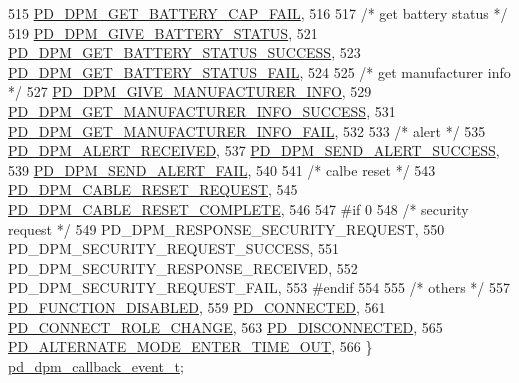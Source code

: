\begin{DoxyCode}
515     \hyperlink{group__usb__pd__stack_gga6e10571af6af1a42760ea442ab580eb8a728741dabfcf75b6187b16075e644879}{PD\_DPM\_GET\_BATTERY\_CAP\_FAIL},
516 
517     \textcolor{comment}{/* get battery status */}
519     \hyperlink{group__usb__pd__stack_gga6e10571af6af1a42760ea442ab580eb8a884eedc8a4ed6f0d1cdbf6c582a0dc36}{PD\_DPM\_GIVE\_BATTERY\_STATUS},
521     \hyperlink{group__usb__pd__stack_gga6e10571af6af1a42760ea442ab580eb8a9e1518da0f1b44c13a019abc96cedfbe}{PD\_DPM\_GET\_BATTERY\_STATUS\_SUCCESS},
523     \hyperlink{group__usb__pd__stack_gga6e10571af6af1a42760ea442ab580eb8ae9bc65c9f7dad30f80fddc56d0d9b3b9}{PD\_DPM\_GET\_BATTERY\_STATUS\_FAIL},
524 
525     \textcolor{comment}{/* get manufacturer info */}
527     \hyperlink{group__usb__pd__stack_gga6e10571af6af1a42760ea442ab580eb8a4eaf5fd4f50a711d55543fd52d58218a}{PD\_DPM\_GIVE\_MANUFACTURER\_INFO},
529     \hyperlink{group__usb__pd__stack_gga6e10571af6af1a42760ea442ab580eb8a425eb7f716e1240fccc53e3b1bbb7ab7}{PD\_DPM\_GET\_MANUFACTURER\_INFO\_SUCCESS},
531     \hyperlink{group__usb__pd__stack_gga6e10571af6af1a42760ea442ab580eb8aaf6af38ecf21f44fbd95f190eb8bee7c}{PD\_DPM\_GET\_MANUFACTURER\_INFO\_FAIL},
532 
533     \textcolor{comment}{/* alert */}
535     \hyperlink{group__usb__pd__stack_gga6e10571af6af1a42760ea442ab580eb8a2ca776167fbab779a679639add785fcd}{PD\_DPM\_ALERT\_RECEIVED},
537     \hyperlink{group__usb__pd__stack_gga6e10571af6af1a42760ea442ab580eb8a7a58d683f0a94b0634aca4ea76df7800}{PD\_DPM\_SEND\_ALERT\_SUCCESS},
539     \hyperlink{group__usb__pd__stack_gga6e10571af6af1a42760ea442ab580eb8a0cbb394fa1a8c85368a4d84c1e5647c2}{PD\_DPM\_SEND\_ALERT\_FAIL},
540 
541     \textcolor{comment}{/* calbe reset */}
543     \hyperlink{group__usb__pd__stack_gga6e10571af6af1a42760ea442ab580eb8a1f1fc746fd209a7967641a63e602ac01}{PD\_DPM\_CABLE\_RESET\_REQUEST},
545     \hyperlink{group__usb__pd__stack_gga6e10571af6af1a42760ea442ab580eb8a52cfbc0c6ae3aea354fbfcbe10572be7}{PD\_DPM\_CABLE\_RESET\_COMPLETE},
546 
547 \textcolor{preprocessor}{#if 0
}
548 \textcolor{preprocessor}{}    \textcolor{comment}{/* security request */}
549     PD\_DPM\_RESPONSE\_SECURITY\_REQUEST,
550     PD\_DPM\_SECURITY\_REQUEST\_SUCCESS,
551     PD\_DPM\_SECURITY\_RESPONSE\_RECEIVED,
552     PD\_DPM\_SECURITY\_REQUEST\_FAIL,
553 \textcolor{preprocessor}{#endif
}
554 \textcolor{preprocessor}{}
555     \textcolor{comment}{/* others */}
557     \hyperlink{group__usb__pd__stack_gga6e10571af6af1a42760ea442ab580eb8a65d5475667c8b5d17a217f8fc3f8a870}{PD\_FUNCTION\_DISABLED},
559     \hyperlink{group__usb__pd__stack_gga6e10571af6af1a42760ea442ab580eb8adbefad204068244fdf75ba1ff211fbfc}{PD\_CONNECTED},
561     \hyperlink{group__usb__pd__stack_gga6e10571af6af1a42760ea442ab580eb8afb6d14742fec55ac288edda0d928683a}{PD\_CONNECT\_ROLE\_CHANGE},
563     \hyperlink{group__usb__pd__stack_gga6e10571af6af1a42760ea442ab580eb8ac8d3cd4dd7fa3432e364a9a3d6602563}{PD\_DISCONNECTED},
565     \hyperlink{group__usb__pd__stack_gga6e10571af6af1a42760ea442ab580eb8aac08145813b28f96e0419edbd1810f93}{PD\_ALTERNATE\_MODE\_ENTER\_TIME\_OUT},
566 \} \hyperlink{group__usb__pd__stack_ga75d3b9ae5fd2d84e59b0754f9855cb61}{pd\_dpm\_callback\_event\_t};
\end{DoxyCode}
